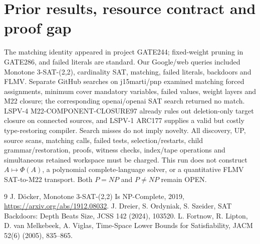 \documentclass[11pt]{article}
\begin{document}
\section{Prior results, resource contract and proof gap}
The matching identity appeared in project GATE244; fixed-weight pruning in GATE286, and failed literals are standard. Our Google/web queries included Monotone 3-SAT-(2,2), cardinality SAT, matching, failed literals, backdoors and FLMV. Separate GitHub searches on j15marti/pnp examined matching forced assignments, minimum cover mandatory variables, failed values, weight layers and M22 closure; the corresponding openai/openai SAT search returned no match. LSPV-4 M22-COMPONENT-CLOSURE97 already rules out deletion-only target closure on connected sources, and LSPV-1 ARC177 supplies a valid but costly type-restoring compiler. Search misses do not imply novelty.
All discovery, UP, source scans, matching calls, failed tests, selection/restarts, child grammar/restoration, proofs, witness checks, index/tape operations and simultaneous retained workspace must be charged. This run does not construct $A\mapsto\Phi(A)$, a polynomial complete-language solver, or a quantitative FLMV SAT-to-M22 transport. Both $P=NP$ and $P\ne NP$ remain OPEN.
\begin{thebibliography}{9}
 J. D\"ocker, Monotone 3-SAT-(2,2) Is NP-Complete, 2019, \url{https://arxiv.org/abs/1912.08032}.
 J. Dreier, S. Ordyniak, S. Szeider, SAT Backdoors: Depth Beats Size, JCSS 142 (2024), 103520.
 L. Fortnow, R. Lipton, D. van Melkebeek, A. Viglas, Time-Space Lower Bounds for Satisfiability, JACM 52(6) (2005), 835--865.
\end{thebibliography}
\end{document}

